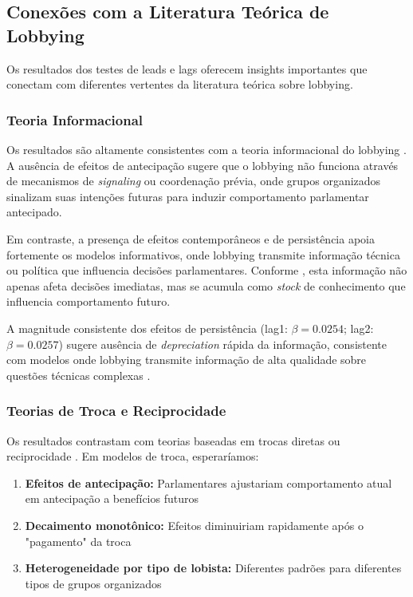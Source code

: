 \subsection{Conexões com a Literatura Teórica de Lobbying}

Os resultados dos testes de leads e lags oferecem insights importantes que conectam com diferentes vertentes da literatura teórica sobre lobbying.

\subsubsection{Teoria Informacional}

Os resultados são altamente consistentes com a teoria informacional do lobbying \cite{austen-smith1998information, grossman2001special}. A ausência de efeitos de antecipação sugere que o lobbying não funciona através de mecanismos de \emph{signaling} ou coordenação prévia, onde grupos organizados sinalizam suas intenções futuras para induzir comportamento parlamentar antecipado.

Em contraste, a presença de efeitos contemporâneos e de persistência apoia fortemente os modelos informativos, onde lobbying transmite informação técnica ou política que influencia decisões parlamentares. Conforme \cite{hall1996institutional}, esta informação não apenas afeta decisões imediatas, mas se acumula como \emph{stock} de conhecimento que influencia comportamento futuro.

A magnitude consistente dos efeitos de persistência (lag1: $\beta = 0.0254$; lag2: $\beta = 0.0257$) sugere ausência de \emph{depreciation} rápida da informação, consistente com modelos onde lobbying transmite informação de alta qualidade sobre questões técnicas complexas \cite{lohmann1995information}.

\subsubsection{Teorias de Troca e Reciprocidade}

Os resultados contrastam com teorias baseadas em trocas diretas ou reciprocidade \cite{bernheim2001theory, dekel2009vote}. Em modelos de troca, esperaríamos:

\begin{enumerate}
\item \textbf{Efeitos de antecipação:} Parlamentares ajustariam comportamento atual em antecipação a benefícios futuros
\item \textbf{Decaimento monotônico:} Efeitos diminuiriam rapidamente após o "pagamento" da troca
\item \textbf{Heterogeneidade por tipo de lobista:} Diferentes padrões para diferentes tipos de grupos organizados
\end{enumerate}

